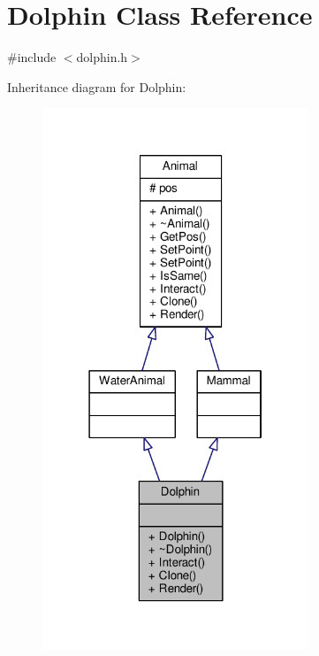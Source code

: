 \hypertarget{classDolphin}{}\section{Dolphin Class Reference}
\label{classDolphin}


{\ttfamily \#include $<$dolphin.\+h$>$}



Inheritance diagram for Dolphin\+:
\nopagebreak
\begin{figure}[H]
\begin{center}
\leavevmode
\includegraphics[width=226pt]{classDolphin__inherit__graph}
\end{center}
\end{figure}


